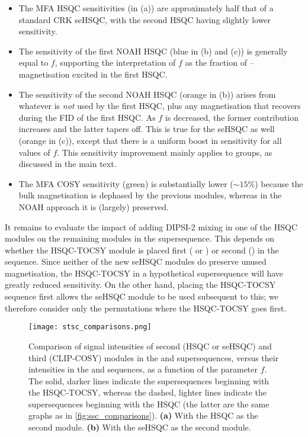 \begin{itemize}
    \item The MFA HSQC sensitivities (in (a)) are approximately half that of a standard CRK seHSQC, with the second HSQC having slightly lower sensitivity.\autocite{Nolis2019CPC}
    \item The sensitivity of the first NOAH HSQC (blue in (b) and (c)) is generally equal to $f$, supporting the interpretation of $f$ as the fraction of \carbon{}--\proton{} magnetisation excited in the first HSQC.
    \item The sensitivity of the second NOAH HSQC (orange in (b)) arises from whatever is \textit{not} used by the first HSQC, plus any magnetisation that recovers during the FID of the first HSQC.
        As $f$ is decreased, the former contribution increases and the latter tapers off.
        This is true for the seHSQC as well (orange in (c)), except that there is a uniform boost in sensitivity for all values of $f$.
        This sensitivity improvement mainly applies to  groups, as discussed in the main text.
    \item The MFA COSY sensitivity (green) is substantially lower ($\sim 15\%$) because the bulk magnetisation is dephased by the previous modules, whereas in the NOAH approach it is (largely) preserved.
\end{itemize}

It remains to evaluate the impact of adding DIPSI-2 mixing in one of the HSQC modules on the remaining modules in the supersequence.
This depends on whether the HSQC-TOCSY module is placed first ( or ) or second () in the sequence.
Since neither of the new seHSQC modules do preserve unused  magnetisation, the HSQC-TOCSY in a hypothetical  supersequence will have greatly reduced sensitivity.
On the other hand, placing the HSQC-TOCSY sequence first allows the seHSQC module to be used subsequent to this; we therefore consider only the permutations where the HSQC-TOCSY goes first.

\begin{figure}
    \centering
    \texttt{[image: stsc\_comparisons.png]}
    \caption{
        Comparison of signal intensities of second (HSQC or seHSQC) and third (CLIP-COSY) modules in the  and  supersequences, versus their intensities in the  and  sequences, as a function of the parameter $f$.
        The solid, darker lines indicate the supersequences beginning with the HSQC-TOCSY, whereas the dashed, lighter lines indicate the supersequences beginning with the HSQC (the latter are the same graphs as in \cref{fig:ssc_comparisons}).
        \textbf{(a)} With the HSQC as the second module.
        \textbf{(b)} With the seHSQC as the second module.
        \andro{}
    }
    \label{fig:stsc_comparisons}
\end{figure}

